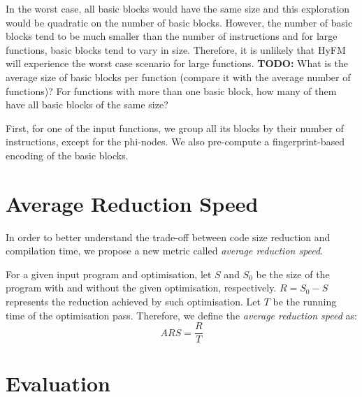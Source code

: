In the worst case, all basic blocks would have the same size and this exploration would be quadratic on the number of basic blocks.
However, the number of basic blocks tend to be much smaller than the number of instructions and for large functions, basic blocks tend to vary in size.
Therefore, it is unlikely that HyFM will experience the worst case scenario for large functions.
\textbf{TODO:} What is the average size of basic blocks per function (compare it with the average number of functions)? For functions with more than one basic block, how many of them have all basic blocks of the same size?





First, for one of the input functions, we group all its blocks by their number of instructions, except for the phi-nodes.
We also pre-compute a fingerprint-based encoding of the basic blocks.




\section{Average Reduction Speed}

In order to better understand the trade-off between code size reduction and compilation time, we propose a new metric called \textit{average reduction speed}. 

\begin{definition}
For a given input program and optimisation, let $S$ and $S_0$ be the size of the program with and without the given optimisation, respectively.
$R = S_0 - S$ represents the reduction achieved by such optimisation.
Let $T$ be the running time of the optimisation pass.
Therefore, we define the \textit{average reduction speed} as:
\[
   ARS = \frac{R}{T}
\]  
\end{definition}

\section{Evaluation}

